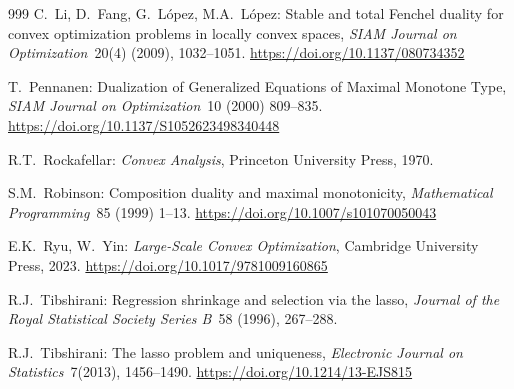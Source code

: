 \documentclass{article}
\begin{document}
\begin{thebibliography}{999}
C.\ Li, D.\ Fang, G.\ L\'opez, M.A.\ L\'opez: 
Stable and total Fenchel duality for convex 
optimization problems in locally convex spaces, 
\emph{SIAM Journal on Optimization}~20(4) (2009), 1032--1051. 
\url{https://doi.org/10.1137/080734352}

T.\ Pennanen:
Dualization of Generalized Equations of Maximal Monotone Type,
\emph{SIAM Journal on Optimization}~10 (2000) 809--835.
\url{https://doi.org/10.1137/S1052623498340448}

R.T.\ Rockafellar: \emph{Convex Analysis}, Princeton University Press, 1970. 

S.M.\ Robinson:
Composition duality and maximal monotonicity,
\emph{Mathematical Programming}~85 (1999) 1--13.
\url{https://doi.org/10.1007/s101070050043}

E.K.\ Ryu, W.\ Yin:
\emph{Large-Scale Convex Optimization}, 
Cambridge University Press, 2023. 
\url{https://doi.org/10.1017/9781009160865}

R.J.\ Tibshirani:
Regression shrinkage and selection via the lasso, 
\emph{Journal of the Royal Statistical Society Series B}~58 
(1996), 267--288. 

R.J.\ Tibshirani:
The lasso problem and uniqueness,
\emph{Electronic Journal on Statistics}~7(2013), 1456--1490. 
\url{https://doi.org/10.1214/13-EJS815} 


\end{thebibliography}
\end{document}

